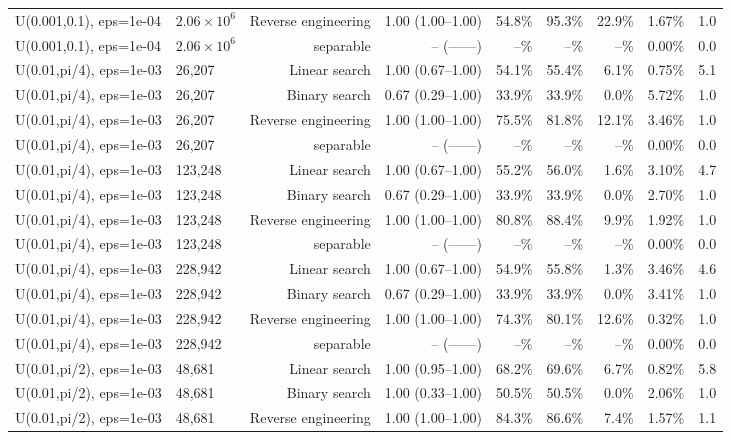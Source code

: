 \begin{tabular}{llrrrrrrr}
U(0.001,0.1), eps=1e-04 & $2.06\times 10^{6}$ & Reverse engineering & 1.00 (1.00--1.00) & 54.8\% & 95.3\% & 22.9\% & 1.67\% & 1.0 \\
U(0.001,0.1), eps=1e-04 & $2.06\times 10^{6}$ & separable & -- (------) & --\% & --\% & --\% & 0.00\% & 0.0 \\
U(0.01,pi/4), eps=1e-03 & 26,207 & Linear search & 1.00 (0.67--1.00) & 54.1\% & 55.4\% & 6.1\% & 0.75\% & 5.1 \\
U(0.01,pi/4), eps=1e-03 & 26,207 & Binary search & 0.67 (0.29--1.00) & 33.9\% & 33.9\% & 0.0\% & 5.72\% & 1.0 \\
U(0.01,pi/4), eps=1e-03 & 26,207 & Reverse engineering & 1.00 (1.00--1.00) & 75.5\% & 81.8\% & 12.1\% & 3.46\% & 1.0 \\
U(0.01,pi/4), eps=1e-03 & 26,207 & separable & -- (------) & --\% & --\% & --\% & 0.00\% & 0.0 \\
U(0.01,pi/4), eps=1e-03 & 123,248 & Linear search & 1.00 (0.67--1.00) & 55.2\% & 56.0\% & 1.6\% & 3.10\% & 4.7 \\
U(0.01,pi/4), eps=1e-03 & 123,248 & Binary search & 0.67 (0.29--1.00) & 33.9\% & 33.9\% & 0.0\% & 2.70\% & 1.0 \\
U(0.01,pi/4), eps=1e-03 & 123,248 & Reverse engineering & 1.00 (1.00--1.00) & 80.8\% & 88.4\% & 9.9\% & 1.92\% & 1.0 \\
U(0.01,pi/4), eps=1e-03 & 123,248 & separable & -- (------) & --\% & --\% & --\% & 0.00\% & 0.0 \\
U(0.01,pi/4), eps=1e-03 & 228,942 & Linear search & 1.00 (0.67--1.00) & 54.9\% & 55.8\% & 1.3\% & 3.46\% & 4.6 \\
U(0.01,pi/4), eps=1e-03 & 228,942 & Binary search & 0.67 (0.29--1.00) & 33.9\% & 33.9\% & 0.0\% & 3.41\% & 1.0 \\
U(0.01,pi/4), eps=1e-03 & 228,942 & Reverse engineering & 1.00 (1.00--1.00) & 74.3\% & 80.1\% & 12.6\% & 0.32\% & 1.0 \\
U(0.01,pi/4), eps=1e-03 & 228,942 & separable & -- (------) & --\% & --\% & --\% & 0.00\% & 0.0 \\
U(0.01,pi/2), eps=1e-03 & 48,681 & Linear search & 1.00 (0.95--1.00) & 68.2\% & 69.6\% & 6.7\% & 0.82\% & 5.8 \\
U(0.01,pi/2), eps=1e-03 & 48,681 & Binary search & 1.00 (0.33--1.00) & 50.5\% & 50.5\% & 0.0\% & 2.06\% & 1.0 \\
U(0.01,pi/2), eps=1e-03 & 48,681 & Reverse engineering & 1.00 (1.00--1.00) & 84.3\% & 86.6\% & 7.4\% & 1.57\% & 1.1 \\

\end{tabular}
